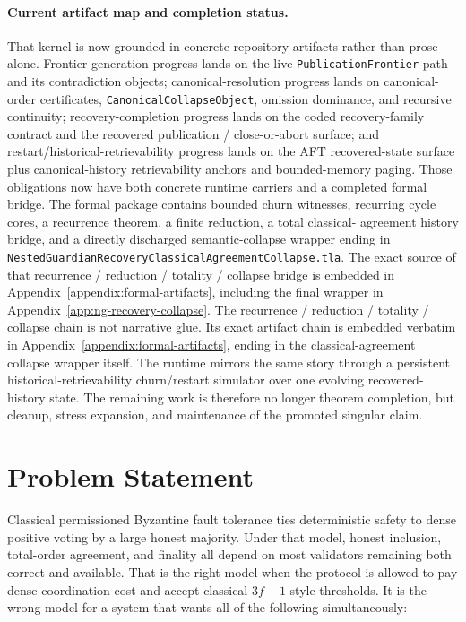 \documentclass[11pt]{article}
\newcommand{\code}[1]{\texttt{#1}}
\begin{document}
\paragraph{Current artifact map and completion status.}
That kernel is now grounded in concrete repository artifacts rather than prose
alone. Frontier-generation progress lands on the live
\code{PublicationFrontier} path and its contradiction objects;
canonical-resolution progress lands on canonical-order certificates,
\code{CanonicalCollapseObject}, omission dominance, and recursive continuity;
recovery-completion progress lands on the coded recovery-family contract and
the recovered publication / close-or-abort surface; and
restart/historical-retrievability progress lands on the AFT recovered-state
surface plus canonical-history retrievability anchors and bounded-memory paging.
Those obligations now have both concrete runtime carriers and a completed
formal bridge. The formal package contains bounded churn witnesses, recurring
cycle cores, a recurrence theorem, a finite reduction, a total classical-
agreement history bridge, and a directly discharged semantic-collapse wrapper
ending in \code{NestedGuardianRecoveryClassicalAgreementCollapse.tla}. The
exact source of that recurrence / reduction / totality / collapse bridge is
embedded in Appendix~\ref{appendix:formal-artifacts}, including the final
wrapper in Appendix~\ref{app:ng-recovery-collapse}.
The recurrence / reduction / totality / collapse chain is not narrative glue.
Its exact artifact chain is embedded verbatim in
Appendix~\ref{appendix:formal-artifacts}, ending in the classical-agreement
collapse wrapper itself.
The runtime mirrors the same story through a persistent historical-retrievability
churn/restart simulator over one evolving recovered-history state. The
remaining work is therefore no longer theorem completion, but cleanup, stress
expansion, and maintenance of the promoted singular claim.

\section{Problem Statement}

Classical permissioned Byzantine fault tolerance ties deterministic safety to
dense positive voting by a large honest majority. Under that model, honest
inclusion, total-order agreement, and finality all depend on most validators
remaining both correct and available. That is the right model when the
protocol is allowed to pay dense coordination cost and accept classical
\(3f+1\)-style thresholds. It is the wrong model for a system that wants all
of the following simultaneously:
\end{document}
